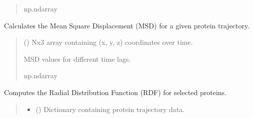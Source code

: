 \documentclass[letterpaper,10pt,english]{sphinxmanual}
\begin{document}
\begin{fulllineitems}
\begin{fulllineitems}
\begin{quote}
\begin{description}
\sphinxAtStartPar
np.ndarray

\end{description}\end{quote}

\end{fulllineitems}


\begin{fulllineitems}
\label{\detokenize{src:src.Analysis_Class.Analysis.calculate_msd}}
\pysigstartsignatures
{}
\pysigstopsignatures
\sphinxAtStartPar
Calculates the Mean Square Displacement (MSD) for a given protein trajectory.
\begin{quote}\begin{description}
\sphinxAtStartPar
{} () \textendash{} Nx3 array containing (x, y, z) coordinates over time.

\sphinxAtStartPar
MSD values for different time lags.

\sphinxAtStartPar
np.ndarray

\end{description}\end{quote}

\end{fulllineitems}


\begin{fulllineitems}
\label{\detokenize{src:src.Analysis_Class.Analysis.calculate_rdf}}
\pysigstartsignatures
{}
\pysigstopsignatures
\sphinxAtStartPar
Computes the Radial Distribution Function (RDF) for selected proteins.
\begin{quote}\begin{description}
\begin{itemize}
\item {} 
\sphinxAtStartPar
{} () \textendash{} Dictionary containing protein trajectory data.


\end{itemize}
\end{description}
\end{quote}
\end{fulllineitems}
\end{fulllineitems}
\end{document}
